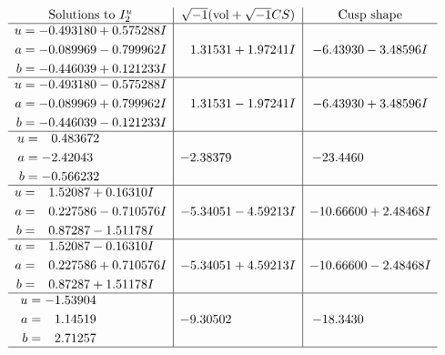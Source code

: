 \documentclass[1p]{elsarticle_modified}
\theoremstyle{definition}
\newcommand{\I}{\sqrt{-1}}
\begin{document}
$$\begin{array}{c|c|c}  
\text{Solutions to }I^u_{2}& \I (\text{vol} + \sqrt{-1}CS) & \text{Cusp shape}\\
 \hline 
\begin{aligned}
u &= -0.493180 + 0.575288 I \\
a &= -0.089969 - 0.799962 I \\
b &= -0.446039 + 0.121233 I\end{aligned}
 & \phantom{-}1.31531 + 1.97241 I & -6.43930 - 3.48596 I \\ \hline\begin{aligned}
u &= -0.493180 - 0.575288 I \\
a &= -0.089969 + 0.799962 I \\
b &= -0.446039 - 0.121233 I\end{aligned}
 & \phantom{-}1.31531 - 1.97241 I & -6.43930 + 3.48596 I \\ \hline\begin{aligned}
u &= \phantom{-}0.483672\phantom{ +0.000000I} \\
a &= -2.42043\phantom{ +0.000000I} \\
b &= -0.566232\phantom{ +0.000000I}\end{aligned}
 & -2.38379\phantom{ +0.000000I} & -23.4460\phantom{ +0.000000I} \\ \hline\begin{aligned}
u &= \phantom{-}1.52087 + 0.16310 I \\
a &= \phantom{-}0.227586 - 0.710576 I \\
b &= \phantom{-}0.87287 - 1.51178 I\end{aligned}
 & -5.34051 - 4.59213 I & -10.66600 + 2.48468 I \\ \hline\begin{aligned}
u &= \phantom{-}1.52087 - 0.16310 I \\
a &= \phantom{-}0.227586 + 0.710576 I \\
b &= \phantom{-}0.87287 + 1.51178 I\end{aligned}
 & -5.34051 + 4.59213 I & -10.66600 - 2.48468 I \\ \hline\begin{aligned}
u &= -1.53904\phantom{ +0.000000I} \\
a &= \phantom{-}1.14519\phantom{ +0.000000I} \\
b &= \phantom{-}2.71257\phantom{ +0.000000I}\end{aligned}
 & -9.30502\phantom{ +0.000000I} & -18.3430\phantom{ +0.000000I}\\
 \hline 
 \end{array}$$\newpage
\end{document}
